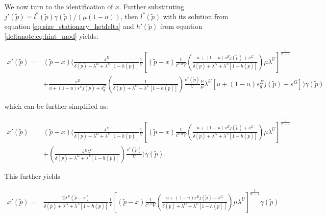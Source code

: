 We now turn to the identification of $x$. Further substituting $j'(\tilde{p}) = l^{*}(\tilde{p}) \gamma(\tilde{p}) / (\mu (1-u))$, then $l^{*}(\tilde{p})$ with its solution from equation \eqref{eq:size_stationary_hetdelta} and $h'(\tilde{p})$ from equation \eqref{deltanote:eq:hint_mod} yields:
%
\begin{small}
    \begin{align}
        x'(\tilde{p}) = & (\tilde{p} - x) \biggl( \frac{\lambda^{E}}{ \delta(\tilde{p}) + \lambda^{G} + \lambda^{E} \left[1 - h(\tilde{p}) \right] }
        \frac{1}{V} \left[ (\tilde{p} - x) \frac{1}{c^{v,0} V} \left( \frac{ u + (1 - u) s^{E} j(\tilde{p}) + s^{G} }{\delta(\tilde{p}) + \lambda^{G} + \lambda^{E} \left[1 - h(\tilde{p})\right] } \right)  \mu \lambda^{U} \right]^{\frac{1}{\eta^{v} - 1}} \nonumber \\
        & + \frac{ s^{E} }{ u + (1 - u) s^{E} j(\tilde{p}) + s_{g}^{G} } \left( \frac{1}{\delta(\tilde{p}) + \lambda^{G} + \lambda^{E} \left[1 - h(\tilde{p})\right]} \right) \frac{v^{*}(\tilde{p})}{V} \frac{\mu}{\mu} \lambda^{U} \left[ u + (1 - u) s_{g}^{E} j(\tilde{p}) + s^{G} \right] \biggr) \gamma(\tilde{p})
    \end{align}
\end{small}
%
which can be further simplified as:
%
\begin{small}
    \begin{align}
        x'(\tilde{p}) = & (\tilde{p} - x) \biggl( \frac{\lambda^{E}}{ \delta(\tilde{p}) + \lambda^{G} + \lambda^{E} \left[ 1 - h(\tilde{p}) \right] }
        \frac{1}{V} \left[ (\tilde{p} - x) \frac{1}{c^{v,0} V} \left( \frac{ u + (1 - u) s^{E} j(\tilde{p}) + s^{G} }{\delta(\tilde{p}) + \lambda^{G} + \lambda^{E} \left[1 - h(\tilde{p}) \right] } \right)  \mu \lambda^{U}\right]^{\frac{1}{\eta^{v} - 1}} \nonumber \\
        & + \left( \frac{s^{E} \lambda^{U}}{\delta(\tilde{p}) + \lambda^{G} + \lambda^{E} \left[ 1 - h(\tilde{p}) \right] } \right) \frac{v^{*}(\tilde{p})}{V}  \biggr) \gamma(\tilde{p}).
    \end{align}
\end{small}
%
This further yields
%
\begin{small}
    \begin{align}
        x'(\tilde{p}) = &  \frac{2 \lambda^{E} (\tilde{p} - x)}{ \delta(\tilde{p}) + \lambda^{G} + \lambda^{E} \left[ 1 - h(\tilde{p}) \right] }
        \frac{1}{V} \left[ (\tilde{p} - x) \frac{1}{c^{v,0} V} \left( \frac{ u + (1 - u) s^{E} j(\tilde{p}) + s^{G} }{\delta(\tilde{p}) + \lambda^{G} + \lambda^{E} \left[1 - h(\tilde{p}) \right] } \right)  \mu \lambda^{U}\right]^{\frac{1}{\eta^{v} - 1}} \gamma(\tilde{p})
    \end{align}
\end{small}
